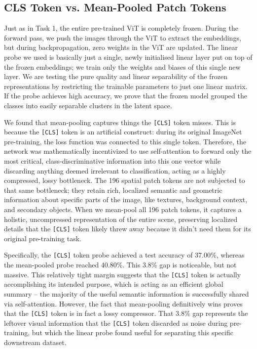 \documentclass{article}
\begin{document}
    \subsection{CLS Token vs. Mean-Pooled Patch Tokens}
    Just as in Task 1, the entire pre-trained ViT is completely frozen. During the forward pass, we push the images through the ViT to extract the embeddings, but during backpropagation, zero weights in the ViT are updated. The linear probe we used is basically just a single, newly initialised linear layer put on top of the frozen embeddings; we train only the weights and biases of this single new layer. We are testing the pure quality and linear separability of the frozen representations by restricting the trainable parameters to just one linear matrix. If the probe achieves high accuracy, we prove that the frozen model grouped the classes into easily separable clusters in the latent space.
    
    We found that mean-pooling captures things the \texttt{[CLS]} token misses. This is because the \texttt{[CLS]} token is an artificial construct: during its original ImageNet pre-training, the loss function was connected to this single token. Therefore, the network was mathematically incentivized to use self-attention to forward only the most critical, class-discriminative information into this one vector while discarding anything deemed irrelevant to classification, acting as a highly compressed, lossy bottleneck. The 196 spatial patch tokens are not subjected to that same bottleneck; they retain rich, localized semantic and geometric information about specific parts of the image, like textures, background context, and secondary objects. When we mean-pool all 196 patch tokens, it captures a holistic, uncompressed representation of the entire scene, preserving localized details that the \texttt{[CLS]} token likely threw away because it didn't need them for its original pre-training task.
    
    Specifically, the \texttt{[CLS]} token probe achieved a test accuracy of 37.00\%, whereas the mean-pooled probe reached 40.80\%. This 3.8\% gap is noticeable, but not massive. This relatively tight margin suggests that the \texttt{[CLS]} token is actually accomplishing its intended purpose, which is acting as an efficient global summary -- the majority of the useful semantic information is successfully shared via self-attention. However, the fact that mean-pooling definitively wins proves that the \texttt{[CLS]} token is in fact a lossy compressor. That 3.8\% gap represents the leftover visual information that the \texttt{[CLS]} token discarded as noise during pre-training, but which the linear probe found useful for separating this specific downstream dataset.
    
\end{document}
